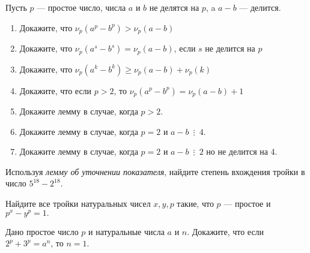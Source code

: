 \documentclass{article}
\begin{document}
    \begin{enumerate_boxed}


        \item Пусть $p$ — простое число, числа $a$ и $b$ не делятся на $p$, a $a - b$ --- делится.
        \begin{enumerate}
            \item Докажите, что $\nu_p(a^p - b^p) > \nu_p(a - b)$
            \item Докажите, что $\nu_p(a^s - b^s) = \nu_p(a - b)$, если $s$ не делится на $p$
            \item Докажите, что $\nu_p(a^k - b^k) \geqslant \nu_p(a - b) + \nu_p(k)$
            \item Докажите, что если $p > 2$, то $\nu_p(a^p - b^p) = \nu_p(a - b) + 1$
            \item Докажите лемму в случае, когда $p > 2$.
            \item Докажите лемму в случае, когда $p = 2$ и $a - b \,\,\,\vdots\,\,\, 4$.
            \item Докажите лемму в случае, когда $p = 2$ и $a - b \,\,\,\vdots\,\,\, 2$ но не делится на 4.
        \end{enumerate}

        \item Используя \textit{лемму об уточнении показателя}, найдите степень вхождения тройки в число $5^{18} - 2^{18}$.
        \item Найдите все тройки натуральных чисел $x, y, p$ такие, что $p$ — простое и $p^x - y^p = 1.$
        \item Дано простое число $p$ и натуральные числа $a$ и $n$.
        Докажите, что если $2^p + 3^p = a^n$, то $n = 1$.


\end{enumerate_boxed}
\end{document}
